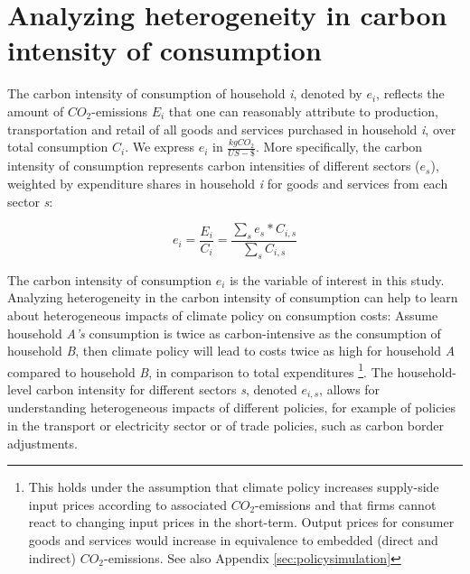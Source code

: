 \documentclass[12pt, a4paper]{article}
\begin{document}
\section{Analyzing heterogeneity in carbon intensity of consumption} \label{sec:methods}


The carbon intensity of consumption of household \textit{i}, denoted by $e_{i}$, reflects the amount of $CO_{2}$-emissions $E_{i}$ that one can reasonably attribute to production, transportation and retail of all goods and services purchased in household \textit{i}, over total consumption $C_{i}$. We express $e_{i}$ in $\frac{kgCO_{2}}{US-\$}$. More specifically, the carbon intensity of consumption represents carbon intensities of different sectors ($e_{s}$), weighted by expenditure shares in household \textit{i} for goods and services from each sector \textit{s}:


\begin{equation} \label{eq:Ci}
e_{i} = \frac{E_{i}}{C_{i}} = \frac{\sum_{s} e_{s}*C_{i,s}}{\sum_{s} C_{i,s}}
\end{equation}


The carbon intensity of consumption $e_{i}$ is the variable of interest in this study. Analyzing heterogeneity in the carbon intensity of consumption can help to learn about heterogeneous impacts of climate policy on consumption costs: Assume household \textit{A's} consumption is twice as carbon-intensive as the consumption of household \textit{B}, then climate policy will lead to costs twice as high for household \textit{A} compared to household \textit{B}, in comparison to total expenditures \footnote{This holds under the assumption that climate policy increases supply-side input prices according to associated $CO_{2}$-emissions and that firms cannot react to changing input prices in the short-term. Output prices for consumer goods and services would increase in equivalence to embedded (direct and indirect) $CO_{2}$-emissions. See also Appendix \ref{sec:policysimulation}}. The household-level carbon intensity for different sectors \textit{s}, denoted $e_{i,s}$, allows for understanding heterogeneous impacts of different policies, for example of policies in the transport or electricity sector or of trade policies, such as carbon border adjustments.
\end{document}
